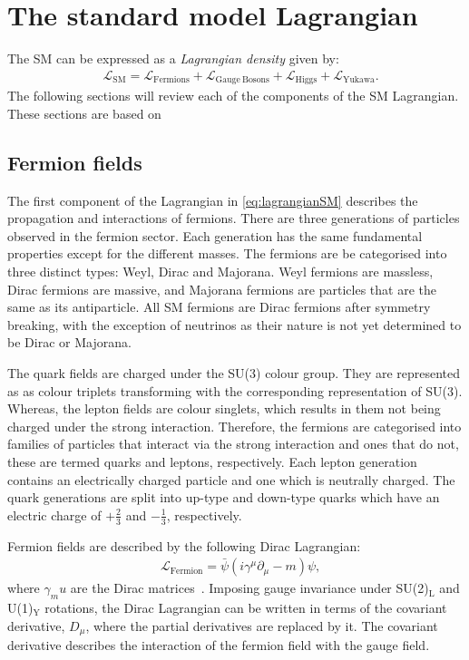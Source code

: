 \section{The standard model Lagrangian}
The SM can be expressed as a \emph{Lagrangian density} given by:
\begin{equation}
    \label{eq:lagrangianSM}
    \begin{aligned}
        & \mathcal{L}_\mathrm{SM} = \mathcal{L}_\mathrm{Fermions} + \mathcal{L}_\mathrm{Gauge~Bosons} + \mathcal{L}_\mathrm{Higgs} + \mathcal{L}_\mathrm{Yukawa}.
    \end{aligned}
\end{equation}
The following sections will review each of the components of the SM Lagrangian. These sections are based on ~\cite{Thomson:2013zua,Peskin:1995ev}

\subsection{Fermion fields}\label{sec:fermionFields}
The first component of the Lagrangian in \cref{eq:lagrangianSM} describes the propagation and interactions of fermions. There are three generations of particles observed in the fermion sector. Each generation has the same fundamental properties except for the different masses. The fermions are be categorised into three distinct types: Weyl, Dirac and Majorana. Weyl fermions are massless, Dirac fermions are massive, and Majorana fermions are particles that are the same as its antiparticle. All SM fermions are Dirac fermions after symmetry breaking, with the exception of neutrinos as their nature is not yet determined to be Dirac or Majorana. 

The quark fields are charged under the SU(3) colour group. They are represented as as colour triplets transforming with the corresponding representation of SU(3). Whereas, the lepton fields are colour singlets, which results in them not being charged under the strong interaction. Therefore, the fermions are categorised into families of particles that interact via the strong interaction and ones that do not, these are termed quarks and leptons, respectively. Each lepton generation contains an electrically charged particle and one which is neutrally charged. The quark generations are split into up-type and down-type quarks which have an electric charge of $+\frac{2}{3}$ and $-\frac{1}{3}$, respectively. 

Fermion fields are described by the following Dirac Lagrangian:
\begin{equation}
    \label{eq:lagrangianFermion}
    \begin{aligned}
        & \mathcal{L}_\mathrm{Fermion} = \bar{\psi}\left(i\gamma^\mu \partial_\mu - m\right)\psi,
    \end{aligned}
\end{equation}
where $\gamma_mu$ are the Dirac matrices~\cite{doi:10.1098/rspa.1928.0023}. Imposing gauge invariance under SU(2)$_\mathrm{L}$ and U(1)$_\mathrm{Y}$ rotations, the Dirac Lagrangian can be written in terms of the covariant derivative, $D_\mu$, where the partial derivatives are replaced by it. The covariant derivative describes the interaction of the fermion field with the gauge field. 

